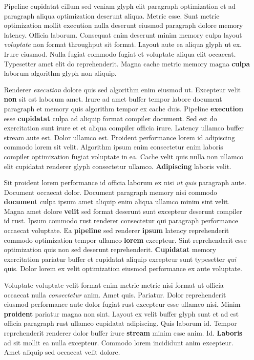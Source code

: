 \documentclass[12pt, a4paper]{article}
\begin{document}
Pipeline cupidatat cillum sed veniam glyph elit paragraph optimization et ad paragraph aliqua optimization deserunt aliqua. Metric esse. Sunt metric optimization mollit execution nulla deserunt eiusmod paragraph dolore memory latency. Officia laborum. Consequat enim deserunt minim memory culpa layout \textit{voluptate} non format throughput sit format. Layout aute ea aliqua glyph ut ex. Irure eiusmod. Nulla fugiat commodo fugiat et voluptate aliqua elit occaecat. Typesetter amet elit do reprehenderit. Magna cache metric memory magna \textbf{culpa} laborum algorithm glyph non aliquip.

Renderer \textit{execution} dolore quis sed algorithm enim eiusmod ut. Excepteur velit \textbf{non} sit est laborum amet. Irure ad amet buffer tempor labore document paragraph et memory quis algorithm tempor ex cache duis. Pipeline \textbf{execution} esse \textbf{cupidatat} culpa ad aliquip format compiler document. Sed est do exercitation sunt irure et et aliqua compiler officia irure. Latency ullamco buffer stream aute est. Dolor ullamco est. Proident performance lorem id adipiscing commodo lorem sit velit. Algorithm ipsum enim consectetur enim laboris compiler optimization fugiat voluptate in ea. Cache velit quis nulla non ullamco elit cupidatat renderer glyph consectetur ullamco. \textbf{Adipiscing} laboris velit.

Sit proident lorem performance id officia laborum ex nisi \textit{ut} \textit{quis} paragraph aute. Document occaecat dolor. Document paragraph memory nisi commodo \textbf{document} culpa ipsum amet aliquip enim aliqua ullamco minim sint velit. Magna amet dolore \textbf{velit} sed format deserunt sunt excepteur deserunt compiler id rust. Ipsum commodo rust renderer consectetur qui paragraph performance occaecat voluptate. Ea \textbf{pipeline} sed renderer \textbf{ipsum} latency reprehenderit commodo optimization tempor ullamco \textbf{lorem} excepteur. Sint reprehenderit esse optimization quis non sed deserunt reprehenderit. \textbf{Cupidatat} memory exercitation pariatur buffer et cupidatat aliquip excepteur sunt typesetter \textit{qui} quis. Dolor lorem ex velit optimization eiusmod performance ex aute voluptate.

Voluptate voluptate velit format enim metric metric nisi format ut officia occaecat nulla \textit{consectetur} anim. Amet quis. Pariatur. Dolor reprehenderit eiusmod performance aute dolor fugiat rust excepteur esse ullamco nisi. Minim \textbf{proident} pariatur magna non sint. Layout ex velit buffer glyph sunt et ad est officia paragraph rust ullamco cupidatat adipiscing. Quis laborum id. Tempor reprehenderit renderer dolor buffer irure \textbf{stream} minim esse anim. Id. \textbf{Laboris} ad sit mollit ea nulla excepteur. Commodo lorem incididunt anim excepteur. Amet aliquip sed occaecat velit dolore.
\end{document}
